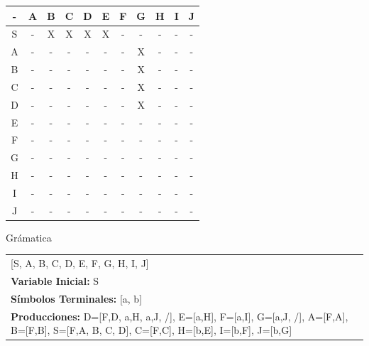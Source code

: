 \documentclass[a4paper,11pt]{article}
\newcommand{\MYp}[1]{ {\color[rgb]{0.392,0.392,0.392}#1} }
\begin{document}
\begin{center}
\begin{tabular}{||c||c||c||c||c||c||c||c||c||c||c||}
\hline
\hline
- & A & B & C & D & E & F & G & H & I & J \\
\hline
\hline
S & - & X & X & X & X & - & - & - & - & - \\
\hline
\hline
A & - & - & - & - & - & - & X & - & - & - \\
\hline
\hline
B & - & - & - & - & - & - & X & - & - & - \\
\hline
\hline
C & - & - & - & - & - & - & X & - & - & - \\
\hline
\hline
D & - & - & - & - & - & - & X & - & - & - \\
\hline
\hline
E & - & - & - & - & - & - & - & - & - & - \\
\hline
\hline
F & - & - & - & - & - & - & - & - & - & - \\
\hline
\hline
G & - & - & - & - & - & - & - & - & - & - \\
\hline
\hline
H & - & - & - & - & - & - & - & - & - & - \\
\hline
\hline
I & - & - & - & - & - & - & - & - & - & - \\
\hline
\hline
J & - & - & - & - & - & - & - & - & - & - \\
\hline
\hline
\end{tabular}
\end{center}

\MYp{\Huge Gr\'amatica}
\newline

\begin{center}\begin{tabular}{ m{15cm} }

\noindent {\bf Variables: }[S, A, B, C, D, E, F, G, H, I, J] \\
{\bf Variable Inicial: }S \\ 
{\bf S\'{i}mbolos Terminales: }[a, b] \\ 
{\bf Producciones: }{D=[F,D, a,H, a,J, /], E=[a,H], F=[a,I], G=[a,J, /], A=[F,A], B=[F,B], S=[F,A, B, C, D], C=[F,C], H=[b,E], I=[b,F], J=[b,G]} \\ 
\end{tabular}
\end{center}
\end{document}
